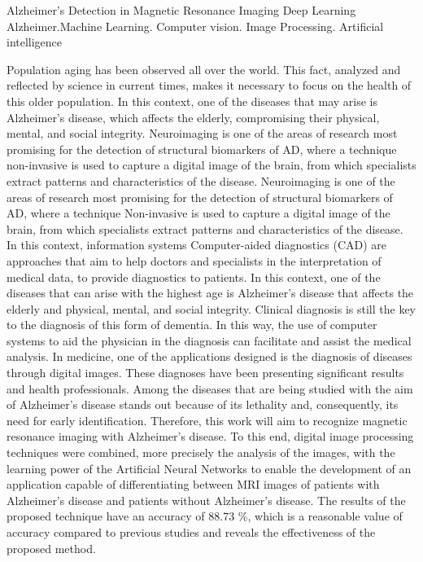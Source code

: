 \documentclass[openright]{UFRGS} %
\begin{document}
\begin{englishabstract}
{Alzheimer's Detection in Magnetic Resonance Imaging Deep Learning}
{Alzheimer.Machine Learning. Computer vision. Image Processing. Artificial intelligence} %

Population aging has been observed all over the world. This fact, analyzed and reflected by science in current times, makes it necessary to focus on the health of this older population. In this context, one of the diseases that may arise is Alzheimer's disease, which affects the elderly, compromising their physical, mental, and social integrity. Neuroimaging is one of the areas of research
most promising for the detection of structural biomarkers of AD, where a technique
non-invasive is used to capture a digital image of the brain, from which specialists extract patterns and characteristics of the disease. Neuroimaging is one of the areas of research
most promising for the detection of structural biomarkers of AD, where a technique
Non-invasive is used to capture a digital image of the brain, from which specialists extract patterns and characteristics of the disease. In this context, information systems
Computer-aided diagnostics (CAD) are approaches that aim to help doctors and
specialists in the interpretation of medical data, to provide diagnostics to patients. In this context, one of the diseases that can arise with the highest age is Alzheimer's disease that affects the elderly and
physical, mental, and social integrity. Clinical diagnosis is still the key
to the diagnosis of this form of dementia. In this way, the use of computer systems to aid the physician in the diagnosis can facilitate and assist the medical analysis. In medicine, one of the applications designed is the diagnosis of diseases through
digital images. These diagnoses have been presenting significant results and
health professionals. Among the diseases that are being studied with the aim of
Alzheimer's disease stands out because of its lethality and, consequently, its need for early identification. Therefore, this work will aim to recognize magnetic resonance imaging with Alzheimer's disease. To this end, digital image processing techniques were combined, more precisely the analysis of the images, with the learning power of the Artificial Neural Networks to enable the development of an application capable of differentiating between MRI images of patients with Alzheimer's disease and patients without Alzheimer's disease. The results of the proposed technique have an accuracy of 88.73 \%, which is a reasonable value of accuracy compared to previous studies and reveals the effectiveness of the proposed method.
\end{englishabstract}
\end{document}
